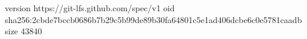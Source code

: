 version https://git-lfs.github.com/spec/v1
oid sha256:2cbde7bccb0686b7b29c5b99de89b30fa64801c5e1ad406dcbe6c0e5781caadb
size 43840
